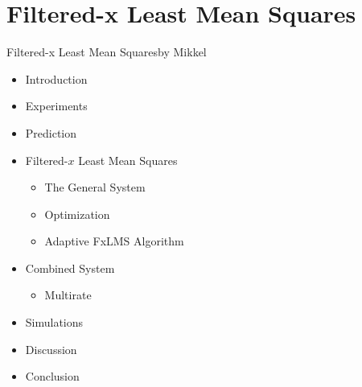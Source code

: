 \section{Filtered-x Least Mean Squares}

\begin{frame}{Filtered-x Least Mean Squares}{by Mikkel}
\begin{itemize}
	\item[] Introduction
	\item[] Experiments
	\item[] Prediction
	\item[] \textcolor{beamer@headercolor}{Filtered-$x$ Least Mean Squares}
	\begin{itemize}
		\item[] \textcolor{beamer@headercolor}{The General System}
		\item[] \textcolor{beamer@headercolor}{Optimization}
		\item[] \textcolor{beamer@headercolor}{Adaptive FxLMS Algorithm}
	\end{itemize}
	\item[] \textcolor{beamer@headercolor}{Combined System}
	\begin{itemize}
		\item[] \textcolor{beamer@headercolor}{Multirate}
	\end{itemize}
	\item[] Simulations
	\item[] Discussion
	\item[] Conclusion
\end{itemize}
\end{frame}

